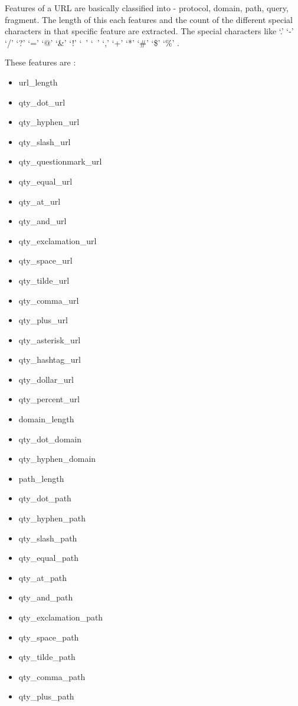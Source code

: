 \par Features of a URL are basically classified into - protocol, domain, path, query, fragment. The length of this each features and the count of the different special characters in that specific feature are extracted. The special characters like  ‘.’ ‘-’ ‘/’ ‘?’ ‘=’ ‘@’ ‘\&’ ‘!’ ‘\ ’ ‘{~}' ‘,’ ‘+’ ‘*’ ‘\#’ ‘\$’ ‘\%’ .
\par These features are :\\ 
{\footnotesize 
\begin{multicols}{3} %
\begin{itemize}
\item url\_length
\item qty\_dot\_url
\item qty\_hyphen\_url
\item qty\_slash\_url
\item qty\_questionmark\_url
\item qty\_equal\_url
\item qty\_at\_url
\item qty\_and\_url
\item qty\_exclamation\_url
\item qty\_space\_url
\item qty\_tilde\_url
\item qty\_comma\_url
\item qty\_plus\_url
\item qty\_asterisk\_url
\item qty\_hashtag\_url
\item qty\_dollar\_url
\item qty\_percent\_url
\item domain\_length
\item qty\_dot\_domain
\item qty\_hyphen\_domain
\item path\_length
\item qty\_dot\_path
\item qty\_hyphen\_path
\item qty\_slash\_path
\item qty\_equal\_path
\item qty\_at\_path
\item qty\_and\_path
\item qty\_exclamation\_path
\item qty\_space\_path
\item qty\_tilde\_path
\item qty\_comma\_path
\item qty\_plus\_path

\end{itemize}
\end{multicols}}
